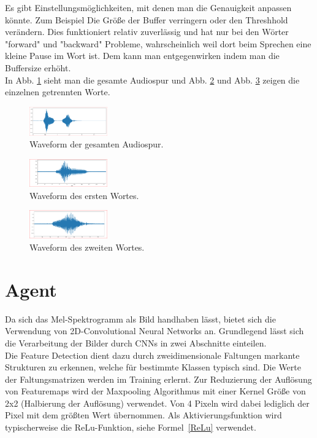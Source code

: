 \documentclass[sigconf]{acmart}
\begin{document}
\noindent Es gibt Einstellungsmöglichkeiten, mit denen man die Genauigkeit anpassen könnte. Zum Beispiel Die Größe der Buffer verringern oder den Threshhold verändern.
Dies funktioniert relativ zuverlässig und hat nur bei den Wörter "forward" und "backward" Probleme, wahrscheinlich weil dort beim Sprechen eine kleine Pause im Wort ist. Dem kann man entgegenwirken indem man die Buffersize erhöht. \\
In Abb. \ref{fig:Audio} sieht man die gesamte Audiospur und Abb. \ref{fig:Audio1} und Abb. \ref{fig:Audio2} zeigen die einzelnen getrennten Worte.

\begin{figure}[ht]
  \includegraphics[width=0.3\textwidth]{images/Audio1}
  \caption{Waveform der gesamten Audiospur.}
  \Description{}
  \label{fig:Audio}
\end{figure} 
\begin{figure}[ht]
  \includegraphics[width=0.3\textwidth]{images/Audio2}
  \caption{Waveform des ersten Wortes.}
  \Description{}
  \label{fig:Audio1}
\end{figure} 
\begin{figure}[ht]
  \includegraphics[width=0.3\textwidth]{images/Audio3}
  \caption{Waveform des zweiten Wortes.}
  \Description{}
  \label{fig:Audio2}
\end{figure} 

\section{Agent}
Da sich das Mel-Spektrogramm als Bild handhaben lässt, bietet sich die Verwendung von 2D-Convolutional Neural Networks an. Grundlegend lässt sich die Verarbeitung der Bilder durch CNNs in zwei Abschnitte einteilen.\\
Die Feature Detection dient dazu durch zweidimensionale Faltungen markante Strukturen zu erkennen, welche für bestimmte Klassen typisch sind. Die Werte der Faltungsmatrizen werden im Training erlernt. Zur Reduzierung der Auflösung von Featuremaps wird der Maxpooling Algorithmus mit einer Kernel Größe von 2x2 (Halbierung der Auflösung) verwendet. Von 4 Pixeln wird dabei lediglich der Pixel mit dem größten Wert übernommen. Als Aktivierungsfunktion wird typischerweise die ReLu-Funktion, siehe Formel~\ref{ReLu} verwendet. 
\end{document}
